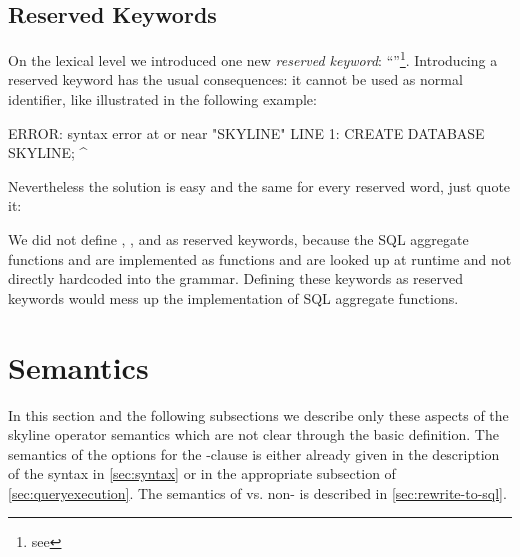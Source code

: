 \subsection{Reserved Keywords}
\label{sec:reservedkeywords}
On the lexical level we introduced one new \emph{reserved
keyword}: ``''\footnote{see
}. Introducing a reserved
keyword has the usual consequences: it cannot be used as normal
identifier, like illustrated in the following example:

\begin{interactive}
ERROR:  syntax error at or near "SKYLINE"
LINE 1: CREATE DATABASE SKYLINE;
                        ^
\end{interactive}
\noindent
Nevertheless the solution is easy and the same for every reserved
word, just quote it:
\begin{interactive}
\end{interactive}

We did not define , , and
 as reserved keywords, because the SQL aggregate
functions  and  are implemented as
functions and are looked up at runtime and not directly hardcoded into
the grammar. Defining these keywords as reserved keywords would mess
up the implementation of SQL aggregate functions.

\section{Semantics}

In this section and the following subsections we describe only these
aspects of the skyline operator semantics which are not clear through
the basic definition.  The semantics of the options for the
-clause is either already given in the description
of the syntax in \autoref{sec:syntax} or in the appropriate subsection
of \autoref{sec:queryexecution}.
The semantics of 
vs. non- is described in
\autoref{sec:rewrite-to-sql}.


